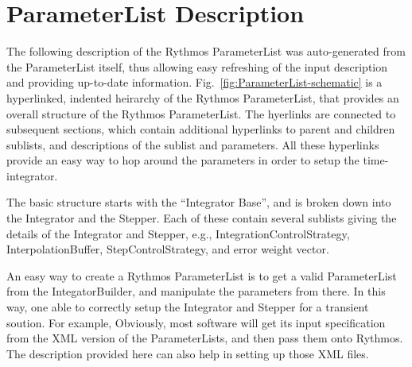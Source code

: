 
\section{ParameterList Description}

The following description of the Rythmos ParameterList was auto-generated
from the ParameterList itself, thus allowing easy refreshing of the
input description and providing up-to-date information. Fig.~\ref{fig:ParameterList-schematic}
is a hyperlinked, indented heirarchy of the Rythmos ParameterList,
that provides an overall structure of the Rythmos ParameterList. The
hyerlinks are connected to subsequent sections, which contain additional
hyperlinks to parent and children sublists, and descriptions of the
sublist and parameters. All these hyperlinks provide an easy way to
hop around the parameters in order to setup the time-integrator. 

The basic structure starts with the ``Integrator Base'', and is
broken down into the Integrator and the Stepper. Each of these contain
several sublists giving the details of the Integrator and Stepper,
e.g., IntegrationControlStrategy, InterpolationBuffer, StepControlStrategy,
and error weight vector.

An easy way to create a Rythmos ParameterList is to get a valid ParameterList
from the IntegatorBuilder, and manipulate the parameters from there.
In this way, one able to correctly setup the Integrator and Stepper
for a transient soution. For example, 
Obviously, most software will get its input specification from the
XML version of the ParameterLists, and then pass them onto Rythmos.
The description provided here can also help in setting up those XML
files. 


